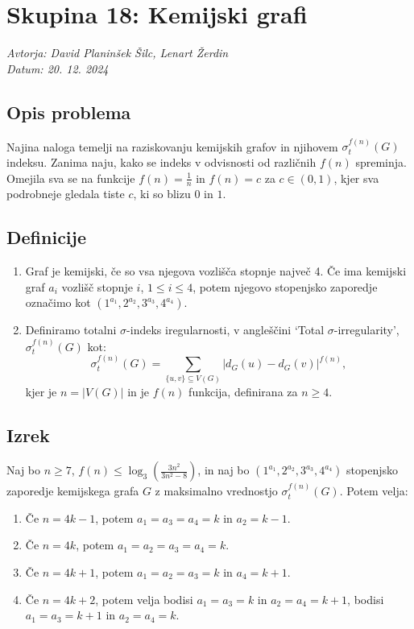 \documentclass{article}
\begin{document}
\section*{Skupina 18: Kemijski grafi}
\textit{Avtorja: David Planinšek Šilc, Lenart Žerdin \\ Datum: 20. 12. 2024 \\}

\subsection*{Opis problema}
Najina naloga temelji na raziskovanju kemijskih grafov in njihovem
$\sigma_t^{f(n)}(G)$ indeksu. Zanima naju, kako se indeks v odvisnosti od
različnih $f(n)$ spreminja. Omejila
sva se na funkcije $f(n) = \frac{1}{n}$ in $f(n) = c$ za 
$c \in (0, 1)$, kjer sva podrobneje gledala tiste $c$, ki so 
blizu $0$ in $1$.

\subsection*{Definicije}

\begin{enumerate}
    \item Graf je kemijski, če so vsa njegova vozlišča stopnje največ 4.
        Če ima kemijski graf $a_i$ vozlišč stopnje $i$, $1 \leq i \leq 4$,
        potem njegovo stopenjsko zaporedje označimo kot $(1^{a_1}, 2^{a_2}, 3^{a_3}, 4^{a_4})$. 

    \item Definiramo totalni $\sigma$-indeks iregularnosti, v angleščini
        `Total $\sigma$-irregularity', $\sigma_t^{f(n)}(G)$ kot:
        \[
        \sigma_t^{f(n)}(G) = \sum_{\{u,v\} \subseteq V(G)} \left| d_G(u) - d_G(v) \right|^{f(n)},
        \]
        kjer je $n = |V(G)|$ in je $f(n)$ funkcija, definirana za $n \geq 4$. 
\end{enumerate}

\subsection*{Izrek}
Naj bo $n \geq 7$, $f(n) \leq \log_3 \left( \frac{3n^2}{3n^2 - 8} \right)$, in naj bo $(1^{a_1}, 2^{a_2}, 3^{a_3}, 4^{a_4})$ stopenjsko zaporedje kemijskega grafa $G$ z maksimalno vrednostjo $\sigma_t^{f(n)}(G)$. Potem velja:
\begin{enumerate}
    \item Če $n = 4k - 1$, potem $a_1 = a_3 = a_4 = k$ in $a_2 = k - 1$.
    \item Če $n = 4k$, potem $a_1 = a_2 = a_3 = a_4 = k$.
    \item Če $n = 4k + 1$, potem $a_1 = a_2 = a_3 = k$ in $a_4 = k + 1$.
    \item Če $n = 4k + 2$, potem velja bodisi $a_1 = a_3 = k$ in $a_2 = a_4 = k + 1$, bodisi $a_1 = a_3 = k + 1$ in $a_2 = a_4 = k$. 
\end{enumerate}
\end{document}
